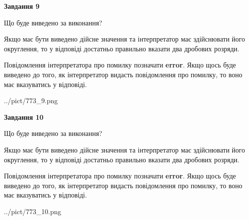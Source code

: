 \documentclass[12pt, ukrainian]{article}
\begin{document}
{\begin {Large}
{\begin {center}\textbf{Завдання 9}\end {center}}\par
Що буде виведено за виконання? \par

Якщо має бути виведено дійсне значення та інтерпретатор має здійснювати його округлення, 
то у відповіді достатньо правильно вказати два дробових розряди.

Повідомлення інтерпретатора про помилку позначати \textbf{error}.
Якщо щось буде виведено до того, як інтерпретатор видасть повідомлення про помилку, 
то воно має вказуватись у відповіді. \par

\begin{center}
	{../pict/773_9.png}
\end{center}
\newpage

{\begin {center}\textbf{Завдання 10}\end {center}}\par
Що буде виведено за виконання? \par

Якщо має бути виведено дійсне значення та інтерпретатор має здійснювати його округлення, 
то у відповіді достатньо правильно вказати два дробових розряди.

Повідомлення інтерпретатора про помилку позначати \textbf{error}.
Якщо щось буде виведено до того, як інтерпретатор видасть повідомлення про помилку, 
то воно має вказуватись у відповіді. \par

\begin{center}
	{../pict/773_10.png}
\end{center}
\newpage

\end {Large}}
\end{document}
